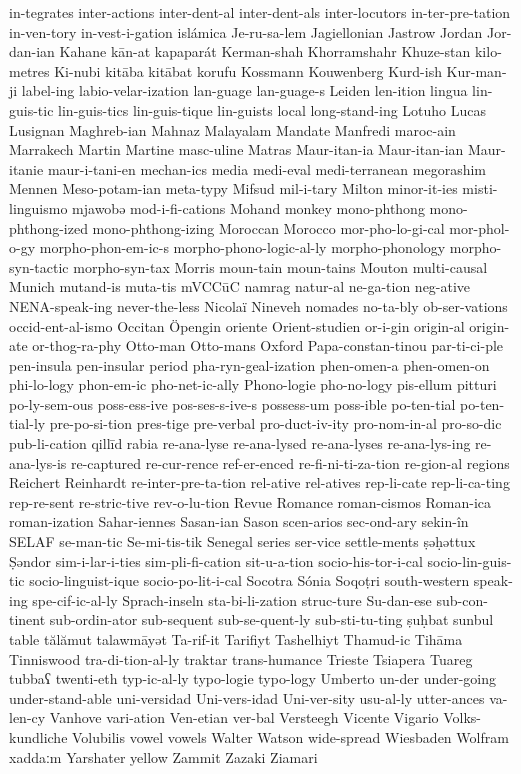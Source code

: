 {in-tegrates
inter-actions
inter-dent-al
inter-dent-als
inter-locutors
in-ter-pre-tation
in-ven-tory
in-vest-i-gation
islámica
Je-ru-sa-lem
Jagiellonian
Jastrow
Jordan
Jor-dan-ian
Kahane
kān-at
kapaparát
Kerman-shah
Khorramshahr
Khuze-stan
kilo-metres
Ki-nubi
kitāba
kitābat
korufu
Kossmann
Kouwenberg
Kurd-ish
Kur-man-ji
label-ing
labio-velar-ization
lan-guage
lan-guage-s
Leiden
len-ition
lingua
lin-guis-tic
lin-guis-tics
lin-guis-tique
lin-guists
local
long-stand-ing
Lotuho
Lucas
Lusignan
Maghreb-ian
Mahnaz
Malayalam
Mandate
Manfredi
maroc-ain
Marrakech
Martin
Martine
masc-uline
Matras
Maur-itan-ia
Maur-itan-ian
Maur-itanie
maur-i-tani-en
mechan-ics
media
medi-eval
medi-terranean
megorashim
Mennen
Meso-potam-ian
meta-typy
Mifsud
mil-i-tary
Milton
minor-it-ies
misti-linguismo
mjawobə
mod-i-fi-cations
Mohand
monkey
mono-phthong
mono-phthong-ized
mono-phthong-izing
Moroccan
Morocco
mor-pho-lo-gi-cal
mor-phol-o-gy
morpho-phon-em-ic-s
morpho-phono-logic-al-ly
morpho-phonology
morpho-syn-tactic
morpho-syn-tax
Morris
moun-tain
moun-tains
Mouton
multi-causal
Munich
mutand-is
muta-tis
mVCCūC
namrag
natur-al
ne-ga-tion
neg-ative
NENA-speak-ing
never-the-less
Nicolaï
Nineveh
nomades
no-ta-bly
ob-ser-vations
occid-ent-al-ismo
Occitan
Öpengin
oriente
Orient-studien
or-i-gin
origin-al
origin-ate
or-thog-ra-phy
Otto-man
Otto-mans
Oxford
Papa-constan-tinou
par-ti-ci-ple
pen-insula
pen-insular
period
pha-ryn-geal-ization
phen-omen-a
phen-omen-on
phi-lo-logy
phon-em-ic
pho-net-ic-ally
Phono-logie
pho-no-logy
pis-ellum
pitturi
po-ly-sem-ous
poss-ess-ive
pos-ses-s-ive-s
possess-um
poss-ible
po-ten-tial
po-ten-tial-ly
pre-po-si-tion
pres-tige
pre-verbal
pro-duct-iv-ity
pro-nom-in-al
pro-so-dic
pub-li-cation
qillīd
rabia
re-ana-lyse
re-ana-lysed
re-ana-lyses
re-ana-lys-ing
re-ana-lys-is
re-captured
re-cur-rence
ref-er-enced
re-fi-ni-ti-za-tion
re-gion-al
regions
Reichert
Reinhardt
re-inter-pre-ta-tion
rel-ative
rel-atives
rep-li-cate
rep-li-ca-ting
rep-re-sent
re-stric-tive
rev-o-lu-tion
Revue
Romance
roman-cismos
Roman-ica
roman-ization
Sahar-iennes
Sasan-ian
Sason
scen-arios
sec-ond-ary
sekin-în
SELAF
se-man-tic
Se-mi-tis-tik
Senegal
series
ser-vice
settle-ments
ṣəḥəttux
Ṣəndor
sim-i-lar-i-ties
sim-pli-fi-cation
sit-u-a-tion
socio-his-tor-i-cal
socio-lin-guis-tic
socio-linguist-ique
socio-po-lit-i-cal
Socotra
Sónia
Soqoṭri
south-western
speak-ing
spe-cif-ic-al-ly
Sprach-inseln
sta-bi-li-zation
struc-ture
Su-dan-ese
sub-con-tinent
sub-ordin-ator
sub-sequent
sub-se-quent-ly
sub-sti-tu-ting
ṣuḥbat
sunbul
table
tălămut
talawmāyət
Ta-rif-it
Tarifiyt
Tashelhiyt
Thamud-ic
Tihāma
Tinniswood
tra-di-tion-al-ly
traktar
trans-humance
Trieste
Tsiapera
Tuareg
tubbaʕ
twenti-eth
typ-ic-al-ly
typo-logie
typo-logy
Umberto
un-der
under-going
under-stand-able
uni-versidad
Uni-vers-idad
Uni-ver-sity
usu-al-ly
utter-ances
va-len-cy
Vanhove
vari-ation
Ven-etian
ver-bal
Versteegh
Vicente
Vigario
Volks-kundliche
Volubilis
vowel
vowels
Walter
Watson
wide-spread
Wiesbaden
Wolfram
xaddaːm
Yarshater
yellow
Zammit
Zazaki
Ziamari
}
